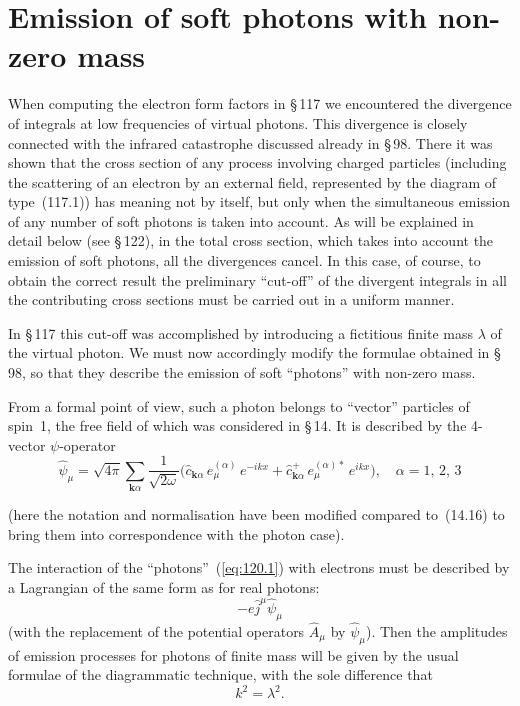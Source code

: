 
\section{Emission of soft photons with non-zero mass}


When computing the electron form factors in \S\,117 we encountered the divergence of integrals at low frequencies of virtual photons. This divergence is closely connected with the infrared catastrophe discussed already in \S\,98. There it was shown that the cross section of any process involving charged particles (including the scattering of an electron by an external field, represented by the diagram of type~(117.1)) has meaning not by itself, but only when the simultaneous emission of any number of soft photons is taken into account. As will be explained in detail below (see \S\,122), in the total cross section, which takes into account the emission of soft photons, all the divergences cancel. In this case, of course, to obtain the correct result the preliminary ``cut-off'' of the divergent integrals in all the contributing cross sections must be carried out in a uniform manner.

In \S\,117 this cut-off was accomplished by introducing a fictitious finite mass $\lambda$ of the virtual photon. We must now accordingly modify the formulae obtained in \S\,98, so that they describe the emission of soft ``photons'' with non-zero mass.

From a formal point of view, such a photon belongs to ``vector'' particles of spin~1, the free field of which was considered in \S\,14. It is described by the 4-vector $\psi$-operator
\begin{equation}
\hat{\psi}_\mu = \sqrt{4\pi} \sum_{\mathbf{k}\alpha} \frac{1}{\sqrt{2\omega}} \bigl(\hat{c}_{\mathbf{k}\alpha}\,e_\mu^{(\alpha)}\,e^{-ikx} + \hat{c}^+_{\mathbf{k}\alpha}\,e_\mu^{(\alpha)*}\,e^{ikx}\bigr), \quad \alpha = 1,\,2,\,3
\label{eq:120.1}
\end{equation}


\noindent (here the notation and normalisation have been modified compared to~(14.16) to bring them into correspondence with the photon case).

The interaction of the ``photons''~(\ref{eq:120.1}) with electrons must be described by a Lagrangian of the same form as for real photons:
\begin{equation}
-e\hat{j}^\mu \hat{\psi}_\mu
\label{eq:120.2}
\end{equation}
(with the replacement of the potential operators $\hat{A}_\mu$ by $\hat{\psi}_\mu$). Then the amplitudes of emission processes for photons of finite mass will be given by the usual formulae of the diagrammatic technique, with the sole difference that
\begin{equation}
k^2 = \lambda^2.
\label{eq:120.3}
\end{equation}

